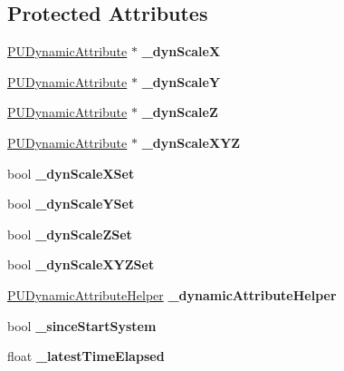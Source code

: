 \subsection*{Protected Attributes}
\begin{DoxyCompactItemize}
\item 
\mbox{\label{classPUScaleAffector_a4fdcaa94334937b52de3df74d913a93b}} 
\hyperlink{classPUDynamicAttribute}{P\+U\+Dynamic\+Attribute} $\ast$ {\bfseries \+\_\+dyn\+ScaleX}
\item 
\mbox{\label{classPUScaleAffector_aa0fe275fc7cbe8ce26cf5dbe25c1cae4}} 
\hyperlink{classPUDynamicAttribute}{P\+U\+Dynamic\+Attribute} $\ast$ {\bfseries \+\_\+dyn\+ScaleY}
\item 
\mbox{\label{classPUScaleAffector_afdd34d8e6387dcd2f00f8df0e19c2816}} 
\hyperlink{classPUDynamicAttribute}{P\+U\+Dynamic\+Attribute} $\ast$ {\bfseries \+\_\+dyn\+ScaleZ}
\item 
\mbox{\label{classPUScaleAffector_af5889499344e765ea1003351c15a06ad}} 
\hyperlink{classPUDynamicAttribute}{P\+U\+Dynamic\+Attribute} $\ast$ {\bfseries \+\_\+dyn\+Scale\+X\+YZ}
\item 
\mbox{\label{classPUScaleAffector_aeeaa36098ea8f36d2b1bc6a497c002cd}} 
bool {\bfseries \+\_\+dyn\+Scale\+X\+Set}
\item 
\mbox{\label{classPUScaleAffector_a3b80865d70e0f736bf211e438264c622}} 
bool {\bfseries \+\_\+dyn\+Scale\+Y\+Set}
\item 
\mbox{\label{classPUScaleAffector_aa29fb34469bb7e19720b93a13b12f0f9}} 
bool {\bfseries \+\_\+dyn\+Scale\+Z\+Set}
\item 
\mbox{\label{classPUScaleAffector_aea8fe878da5d783c68aeb37512f17bce}} 
bool {\bfseries \+\_\+dyn\+Scale\+X\+Y\+Z\+Set}
\item 
\mbox{\label{classPUScaleAffector_a492fb974ff747f4c2fce5f2ac81879cf}} 
\hyperlink{classPUDynamicAttributeHelper}{P\+U\+Dynamic\+Attribute\+Helper} {\bfseries \+\_\+dynamic\+Attribute\+Helper}
\item 
\mbox{\label{classPUScaleAffector_ae0a1fc70d9a2e22b12d01380ae7f3450}} 
bool {\bfseries \+\_\+since\+Start\+System}
\item 
\mbox{\label{classPUScaleAffector_a8d83f3c6d91aa1d8b17d872f96d56909}} 
float {\bfseries \+\_\+latest\+Time\+Elapsed}
\end{DoxyCompactItemize}
